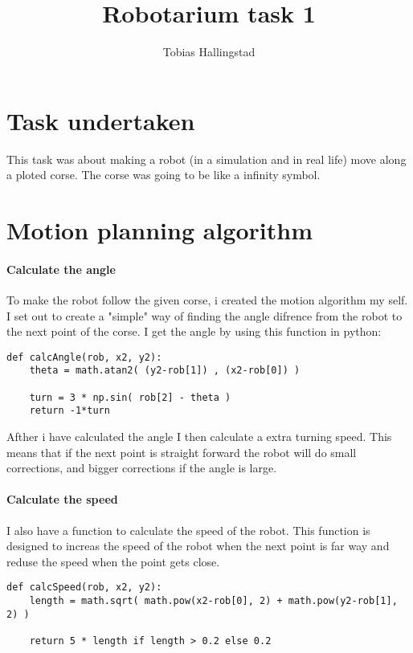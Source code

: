 \documentclass{article}
\title{Robotarium task 1}
\author{Tobias Hallingstad}
\begin{document}
    \maketitle

    \section{Task undertaken}
    This task was about making a robot (in a simulation and in real life) move along a ploted corse. The corse was going to be like a infinity symbol.

    \section{Motion planning algorithm}
    
    \paragraph{Calculate the angle}
        To make the robot follow the given corse, i created the motion algorithm my self. I set out to create a "simple" way of finding the angle difrence from the robot to the next point of the corse. I get the angle by using this function in python:

        \begin{verbatim}
def calcAngle(rob, x2, y2):
    theta = math.atan2( (y2-rob[1]) , (x2-rob[0]) )

    turn = 3 * np.sin( rob[2] - theta ) 
    return -1*turn
        \end{verbatim}

        Afther i have calculated the angle I then calculate a extra turning speed. This means that if the next point is straight forward the robot will do small corrections, and bigger corrections if the angle is large.

    \paragraph{Calculate the speed}
        I also have a function to calculate the speed of the robot. This function is designed to increas the speed of the robot when the next point is far way and reduse the speed when the point gets close.

        \begin{verbatim}
def calcSpeed(rob, x2, y2):
    length = math.sqrt( math.pow(x2-rob[0], 2) + math.pow(y2-rob[1], 2) )

    return 5 * length if length > 0.2 else 0.2
        \end{verbatim}
\end{document}
